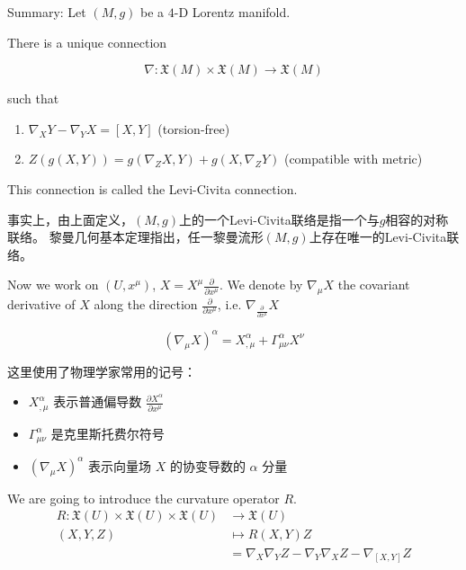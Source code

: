 Summary: Let $(M, g)$ be a $4$-D Lorentz manifold.

There is a unique connection

\[
\nabla : \mathfrak{X}(M) \times \mathfrak{X}(M) \rightarrow \mathfrak{X}(M)
\]

such that

\begin{enumerate}[label=(\roman*)]
    \item $\nabla_X Y - \nabla_Y X = [X, Y]$ \quad (torsion-free)
    \item $Z(g(X,Y)) = g(\nabla_Z X, Y) + g(X, \nabla_Z Y)$ \quad (compatible with metric)
\end{enumerate}

This connection is called the Levi-Civita connection.

\begin{remark}
    事实上，由上面定义，$(M,g)$上的一个Levi-Civita联络是指一个与$g$相容的对称联络。
    黎曼几何基本定理指出，任一黎曼流形$(M,g)$上存在唯一的Levi-Civita联络。
\end{remark}


Now we work on $(U, x^\mu)$, $X = X^\mu \frac{\partial}{\partial x^\mu}$.
We denote by $\nabla_\mu X$ the covariant derivative of $X$ along the direction $\frac{\partial}{\partial x^\mu}$, i.e. $\nabla_{\frac{\partial}{\partial x^\mu}} X$

\[
(\nabla_\mu X)^\alpha = X^\alpha_{,\mu} + \Gamma_{\mu\nu}^\alpha X^\nu
\]

\begin{remark}
这里使用了物理学家常用的记号：
\begin{itemize}
    \item $X^\alpha_{,\mu}$ 表示普通偏导数 $\frac{\partial X^\alpha}{\partial x^\mu}$
    \item $\Gamma_{\mu\nu}^\alpha$ 是克里斯托费尔符号
    \item $(\nabla_\mu X)^\alpha$ 表示向量场 $X$ 的协变导数的 $\alpha$ 分量
\end{itemize}
\end{remark}


We are going to introduce the curvature operator \( R \).
\begin{equation*}
    \begin{aligned}
        R : \mathfrak{X}(U) \times \mathfrak{X}(U) \times \mathfrak{X}(U) &\rightarrow \mathfrak{X}(U) \\
(X, Y, Z) &\mapsto R(X,Y)Z \\
&= \nabla_X \nabla_Y Z - \nabla_Y \nabla_X Z - \nabla_{[X,Y]} Z
    \end{aligned}
\end{equation*}
 


